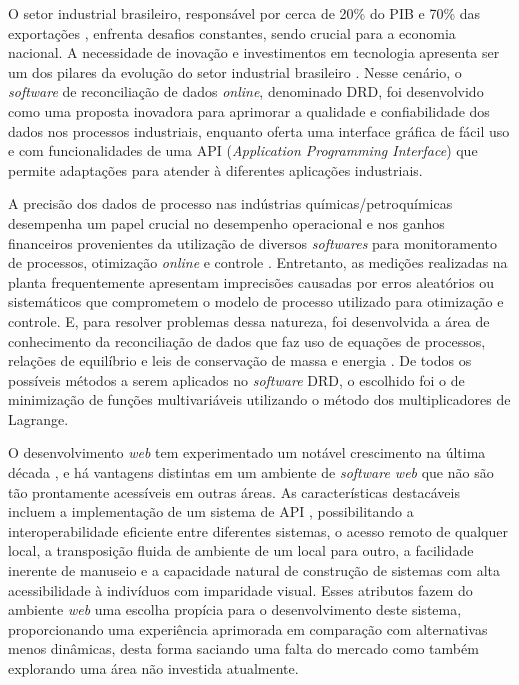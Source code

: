 \label{Cap:Introducao}

O setor industrial brasileiro, responsável por cerca de 20\% do PIB e 70\% das exportações \cite{cni2024}, enfrenta desafios constantes, sendo crucial para a economia nacional. A necessidade de inovação e investimentos em tecnologia apresenta ser um dos pilares da evolução do setor industrial brasileiro \cite{produtividadeindustria}. Nesse cenário, o \textit{software} de reconciliação de dados \textit{online}, denominado DRD, foi desenvolvido como uma proposta inovadora para aprimorar a qualidade e confiabilidade dos dados nos processos industriais, enquanto oferta uma interface gráfica de fácil uso e com funcionalidades de uma API (\textit{Application Programming Interface}) que permite adaptações para atender à diferentes aplicações industriais.

A precisão dos dados de processo nas indústrias químicas/petroquímicas desempenha um papel crucial no desempenho operacional e nos ganhos financeiros provenientes da utilização de diversos \textit{softwares} para monitoramento de processos, otimização \textit{online} e controle \cite{datarecshakar}. Entretanto, as medições realizadas na planta frequentemente apresentam imprecisões causadas por erros aleatórios ou sistemáticos que comprometem o modelo de processo utilizado para otimização e controle. E, para resolver problemas dessa natureza, foi desenvolvida a área de conhecimento da reconciliação de dados que faz uso de equações de processos, relações de equilíbrio e leis de conservação de massa e energia \cite{reformulationdatarecon}. De todos os possíveis métodos a serem aplicados no \textit{software} DRD, o escolhido foi o de minimização de funções multivariáveis utilizando o método dos multiplicadores de Lagrange. 

O desenvolvimento \textit{web} tem experimentado um notável crescimento na última década \cite{webusage}, e há vantagens distintas em um ambiente de \textit{software web} que não são tão prontamente acessíveis em outras áreas. As características destacáveis incluem a implementação de um sistema de API \cite{apirest}, possibilitando a interoperabilidade eficiente entre diferentes sistemas, o acesso remoto de qualquer local, a transposição fluida de ambiente de um local para outro, a facilidade inerente de manuseio \cite{apiimportance} e a capacidade natural de construção de sistemas com alta acessibilidade à indivíduos com imparidade visual. Esses atributos fazem do ambiente \textit{web} uma escolha propícia para o desenvolvimento deste sistema, proporcionando uma experiência aprimorada em comparação com alternativas menos dinâmicas, desta forma saciando uma falta do mercado como também explorando uma área não investida atualmente.

